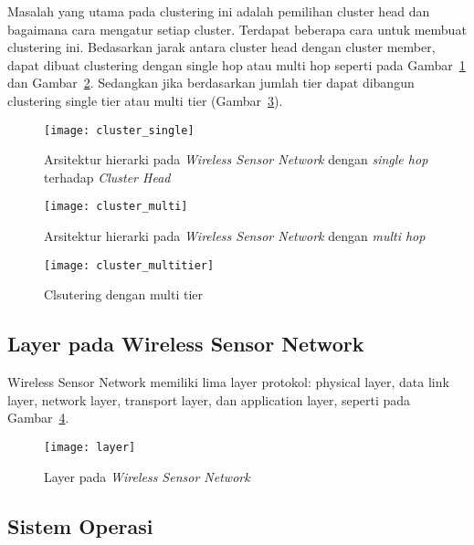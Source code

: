 Masalah yang utama pada clustering ini adalah pemilihan cluster head dan bagaimana cara mengatur setiap cluster. Terdapat beberapa cara untuk membuat clustering ini. Bedasarkan jarak antara cluster head dengan cluster member, dapat dibuat clustering dengan single hop atau multi hop seperti pada Gambar~\ref{fig:cluster_single} dan Gambar~\ref{fig:cluster_multi}. Sedangkan jika berdasarkan jumlah tier dapat dibangun clustering single tier atau multi tier (Gambar~\ref{fig:cluster_multitier}).
\begin{figure} [H]
	\centering  
	\texttt{[image: cluster\_single]}  
	\caption[Arsitektur hierarki pada \textit{Wireless Sensor Network} dengan \textit{single hop} terhadap \textit{Cluster Head}]{Arsitektur hierarki pada \textit{Wireless Sensor Network} dengan \textit{single hop} terhadap \textit{Cluster Head}} 
	\label{fig:cluster_single} 
\end{figure} 
\begin{figure} [H]
	\centering  
	\texttt{[image: cluster\_multi]}  
	\caption[Arsitektur hierarki pada \textit{Wireless Sensor Network} dengan \textit{multi hop}]{Arsitektur hierarki pada \textit{Wireless Sensor Network} dengan \textit{multi hop}} 
	\label{fig:cluster_multi} 
\end{figure} 
\begin{figure} [H]
	\centering  
	\texttt{[image: cluster\_multitier]}  
	\caption[Clsutering dengan multi tier]{Clsutering dengan multi tier} 
	\label{fig:cluster_multitier} 
\end{figure}


\subsection{Layer pada Wireless Sensor Network}
Wireless Sensor Network memiliki lima layer protokol: physical layer, data link layer, network layer, transport layer, dan application layer, seperti pada Gambar~\ref{fig:layer}. 
\begin{figure} [H]
	\centering  
	\texttt{[image: layer]}  
	\caption[Layer pada \textit{Wireless Sensor Network}]{Layer pada \textit{Wireless Sensor Network}} 
	\label{fig:layer} 
\end{figure} 

\subsection{Sistem Operasi}



